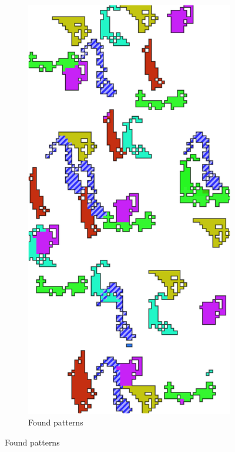 \documentclass{llncs}
\begin{document}
\begin{figure}
~
\begin{subfigure}[t]{0.25\textwidth}
\centering
\includegraphics[scale=.9]{img/exp_result_2.png}
\caption{Found patterns}
\label{fig:rilc}
\end{subfigure}%

\end{figure}
\end{document}
